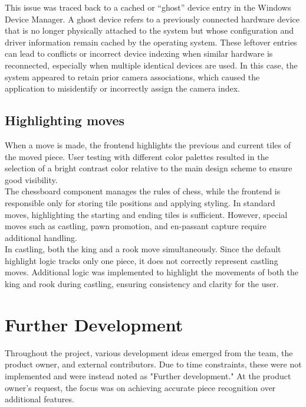 This issue was traced back to a cached or “ghost” device entry in the Windows Device Manager. A ghost device refers to a previously connected hardware device that is no longer physically attached to the system but whose configuration and driver information remain cached by the operating system. These leftover entries can lead to conflicts or incorrect device indexing when similar hardware is reconnected, especially when multiple identical devices are used. In this case, the system appeared to retain prior camera associations, which caused the application to misidentify or incorrectly assign the camera index. \\

\subsection{Highlighting moves}
When a move is made, the frontend highlights the previous and current tiles of the moved piece. User testing with different color palettes resulted in the selection of a bright contrast color relative to the main design scheme to ensure good visibility. \\

The chessboard component manages the rules of chess, while the frontend is responsible only for storing tile positions and applying styling. In standard moves, highlighting the starting and ending tiles is sufficient. However, special moves such as \gls{castling}, pawn \gls{promotion}, and \gls{en-passant} capture require additional handling. \\

In \gls{castling}, both the king and a rook move simultaneously. Since the default highlight logic tracks only one piece, it does not correctly represent \gls{castling} moves. Additional logic was implemented to highlight the movements of both the king and rook during \gls{castling}, ensuring consistency and clarity for the user.







\section{Further Development}
Throughout the project, various development ideas emerged from the team, the product owner, and external contributors. Due to time constraints, these were not implemented and were instead noted as "Further development." At the product owner's request, the focus was on achieving accurate piece recognition over additional features.


